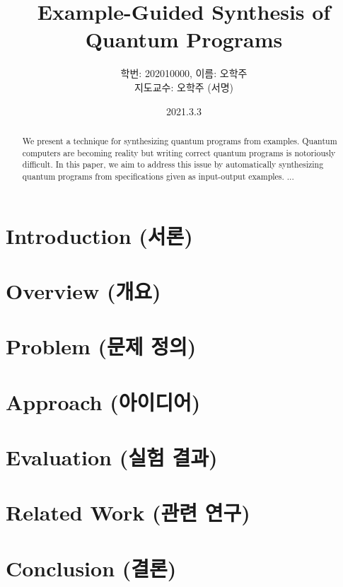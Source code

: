 \documentclass[twocolumn]{article}
\begin{document}
\title{Example-Guided Synthesis of Quantum Programs}
\author{
학번: 202010000, 이름: 오학주 \\ 
지도교수: 오학주 (서명)}
\date{2021.3.3}
\maketitle

\begin{abstract}
We present a technique for synthesizing quantum programs from examples. 
Quantum computers are becoming reality but writing correct quantum programs is notoriously difficult. 
In this paper, we aim to address this issue by automatically synthesizing quantum programs from specifications given as input-output examples. ...

\end{abstract}

\section{Introduction (서론)}

\section{Overview (개요)}

\section{Problem (문제 정의)}

\section{Approach (아이디어)}

\section{Evaluation (실험 결과)}

\section{Related Work (관련 연구)}

\section{Conclusion (결론)}
\end{document}
